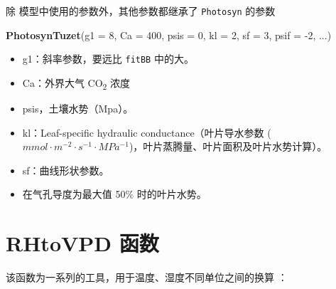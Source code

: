 \documentclass[
]{krantz}
\makeatletter
\newenvironment{Shaded}{\begin{snugshade}}{\end{snugshade}}
\newcommand{\DataTypeTok}[1]{\textcolor[rgb]{0.13,0.29,0.53}{#1}}
\newcommand{\DecValTok}[1]{\textcolor[rgb]{0.00,0.00,0.81}{#1}}
\newcommand{\KeywordTok}[1]{\textcolor[rgb]{0.13,0.29,0.53}{\textbf{#1}}}
\newcommand{\NormalTok}[1]{#1}
\providecommand{\tightlist}{%
  \setlength{\itemsep}{0pt}\setlength{\parskip}{0pt}}
\newenvironment{kframe}{%
\medskip{}
\setlength{\fboxsep}{.8em}
 \def\at@end@of@kframe{}%
 \ifinner\ifhmode%
  \def\at@end@of@kframe{\end{minipage}}%
  \begin{minipage}{\columnwidth}%
 \fi\fi%
 \def\FrameCommand##1{\hskip\@totalleftmargin \hskip-\fboxsep
 \colorbox{shadecolor}{##1}\hskip-\fboxsep
     \hskip-\linewidth \hskip-\@totalleftmargin \hskip\columnwidth}%
 \MakeFramed {\advance\hsize-\width
   \@totalleftmargin\z@ \linewidth\hsize
   \@setminipage}}%
 {\par\unskip\endMakeFramed%
 \at@end@of@kframe}
\renewenvironment{Shaded}{\begin{kframe}}{\end{kframe}}
\makeatother
\begin{document}
除 \citet{tuzet2003a} 模型中使用的参数外，其他参数都继承了 \texttt{Photosyn} 的参数

\begin{Shaded}
\begin{Highlighting}[]
\KeywordTok{PhotosynTuzet}\NormalTok{(}\DataTypeTok{g1 =} \DecValTok{8}\NormalTok{, }\DataTypeTok{Ca =} \DecValTok{400}\NormalTok{, }\DataTypeTok{psis =} \DecValTok{0}\NormalTok{,}
              \DataTypeTok{kl =} \DecValTok{2}\NormalTok{, }\DataTypeTok{sf =} \DecValTok{3}\NormalTok{, }\DataTypeTok{psif =} \DecValTok{-2}\NormalTok{,}
\NormalTok{...)}
\end{Highlighting}
\end{Shaded}

\begin{itemize}
\tightlist
\item
  g1：斜率参数，要远比 \texttt{fitBB} 中的大。
\item
  Ca：外界大气 CO\textsubscript{2} 浓度
\item
  psis，土壤水势（Mpa）。
\item
  kl：Leaf-speciﬁc hydraulic conductance（叶片导水参数 (\(mmol \cdot m^{-2} \cdot s^{-1} \cdot MPa^{-1}\))，叶片蒸腾量、叶片面积及叶片水势计算）。
\item
  sf：曲线形状参数。
\item
  在气孔导度为最大值 50\% 时的叶片水势。
\end{itemize}

\cleardoublepage

\hypertarget{rhtovpd}{%
\chapter{RHtoVPD 函数}\label{rhtovpd}}

该函数为一系列的工具，用于温度、湿度不同单位之间的换算 \citet{Jones1993Plants} ：
\end{document}
